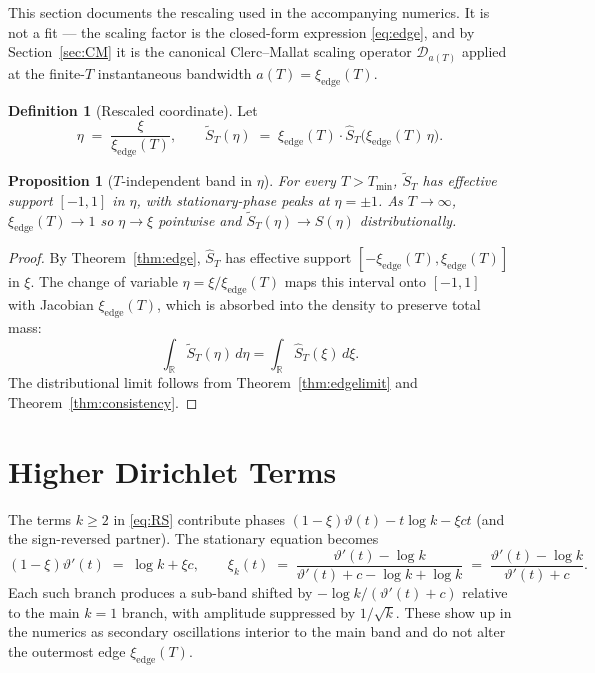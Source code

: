 \documentclass[11pt,a4paper]{article}
\theoremstyle{plain}
\newtheorem{proposition}[theorem]{Proposition}
\theoremstyle{definition}
\newtheorem{definition}[theorem]{Definition}
\newcommand{\R}{\mathbb{R}}
\begin{document}
This section documents the rescaling used in the accompanying numerics. It is not a fit --- the scaling factor is the closed-form expression \eqref{eq:edge}, and by Section~\ref{sec:CM} it is the canonical Clerc--Mallat scaling operator $\mathcal{D}_{a(T)}$ applied at the finite-$T$ instantaneous bandwidth $a(T)=\xi_{\mathrm{edge}}(T)$.

\begin{definition}[Rescaled coordinate]
Let
\[
\eta \;=\; \frac{\xi}{\xi_{\mathrm{edge}}(T)},\qquad
\widetilde{S}_T(\eta) \;=\; \xi_{\mathrm{edge}}(T)\cdot \widehat{S}_T\!\bigl(\xi_{\mathrm{edge}}(T)\,\eta\bigr).
\]
\end{definition}

\begin{proposition}[$T$-independent band in $\eta$]\label{prop:rescale}
For every $T>T_{\min}$, $\widetilde{S}_T$ has effective support $[-1,1]$ in $\eta$, with stationary-phase peaks at $\eta=\pm 1$. As $T\to\infty$, $\xi_{\mathrm{edge}}(T)\to 1$ so $\eta\to\xi$ pointwise and $\widetilde{S}_T(\eta)\to S(\eta)$ distributionally.
\end{proposition}

\begin{proof}
By Theorem~\ref{thm:edge}, $\widehat{S}_T$ has effective support $[-\xi_{\mathrm{edge}}(T),\xi_{\mathrm{edge}}(T)]$ in $\xi$. The change of variable $\eta=\xi/\xi_{\mathrm{edge}}(T)$ maps this interval onto $[-1,1]$ with Jacobian $\xi_{\mathrm{edge}}(T)$, which is absorbed into the density to preserve total mass:
\[
\int_{\R}\widetilde{S}_T(\eta)\,d\eta = \int_{\R}\widehat{S}_T(\xi)\,d\xi .
\]
The distributional limit follows from Theorem~\ref{thm:edgelimit} and Theorem~\ref{thm:consistency}.
\end{proof}

\section{Higher Dirichlet Terms}\label{sec:higher}

The terms $k\ge 2$ in \eqref{eq:RS} contribute phases $(1-\xi)\vartheta(t) - t\log k - \xi c t$ (and the sign-reversed partner). The stationary equation becomes
\[
(1-\xi)\vartheta'(t) \;=\; \log k + \xi c,\qquad
\xi_k(t) \;=\; \frac{\vartheta'(t)-\log k}{\vartheta'(t)+c-\log k+\log k} \;=\; \frac{\vartheta'(t)-\log k}{\vartheta'(t)+c} .
\]
Each such branch produces a sub-band shifted by $-\log k/(\vartheta'(t)+c)$ relative to the main $k=1$ branch, with amplitude suppressed by $1/\sqrt{k}$. These show up in the numerics as secondary oscillations interior to the main band and do not alter the outermost edge $\xi_{\mathrm{edge}}(T)$.
\end{document}
